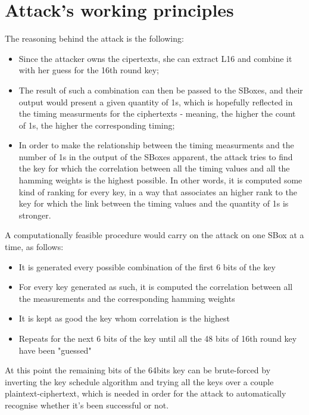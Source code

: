 \documentclass[11pt]{article} %
\begin{document}
\section{Attack's working principles}
The reasoning behind the attack is the following: 
\begin{itemize}
  \item Since the attacker owns the cipertexts, she can extract L16 and combine it with her guess for the 16th round key;
  \item The result of such a combination can then be passed to the SBoxes, and their output would present a given quantity of 1s, which is hopefully reflected in the timing measurments for the ciphertexts - meaning, the higher the count of 1s, the higher the corresponding timing;
  \item In order to make the relationship between the timing measurments and the number of 1s in the output of the SBoxes apparent, the attack tries to find the key for which the correlation between all the timing values and all the hamming weights is the highest possible. In other words, it is computed some kind of ranking for every key, in a way that associates an higher rank to the key for which the link between the timing values and the quantity of 1s is stronger.
\end{itemize}
A computationally feasible procedure would carry on the attack on one SBox at a time, as follows:
\begin{itemize}
	\item It is generated every possible combination of the first 6 bits of the key
	\item For every key generated as such, it is computed the correlation between all the measurements and the corresponding hamming weights
	\item It is kept as good the key whom correlation is the highest 
	\item Repeats for the next 6 bits of the key until all the 48 bits of 16th round key have been "guessed"
\end{itemize}
At this point the remaining bits of the 64bits key can be brute-forced by inverting the key schedule algorithm and trying all the keys over a couple plaintext-ciphertext, which is needed in order for the attack to automatically recognise whether it's been successful or not.
\end{document}

